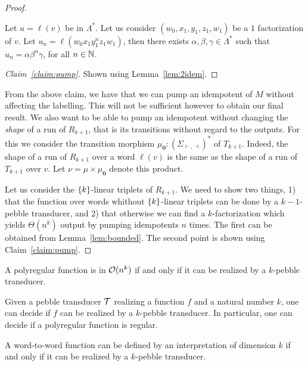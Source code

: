 \begin{proof}
    \begin{claim}\label{claim:pump}
        Let $u=\ell(v)$ be in $ \Lambda^*$.
        Let us consider $(w_0,x_1,y_1,z_1,w_1)$ be a $1$ factorization of $v$.
        Let $u_n=\ell(w_0x_1y_1^nz_1w_1)$, then there exists $\alpha,\beta,\gamma\in \Lambda^*$ such that $u_n=\alpha\beta^n\gamma$, for all $n\in \mathbb{N}$.
    \end{claim}
\begin{proof}[Claim~\ref{claim:pump}]
    Shown using Lemma~\ref{lem:2idem}.
\end{proof}
From the above claim, we have that we can pump an idempotent of $M$ without affecting the labelling.
This will not be sufficient however to obtain our final result. We also want to be able to pump an idempotent without changing the \emph{shape} of a run of $R_{k+1}$, that is its transitions without regard to the outputs.
For this we consider the transition morphism $\mu_{\mathbf 0}:(\Sigma_{\vdash,\dashv})^*$ of $T_{k+1}$. Indeed, the shape of a run of $R_{k+1}$ over a word $\ell(v)$ is the same as the shape of a run of $T_{k+1}$ over $v$.
Let $\nu=\mu\times \mu_{\mathbf 0}$ denote this product.

Let us consider the $\{k\}$-linear triplets of $R_{k+1}$.
We need to show two things, 1) that the function over words whithout $\{k\}$-linear triplets can be done by a $k{-}1$-pebble transducer, and 2) that otherwise we can find a $k$-factorization which yields $\Theta(n^k)$ output by pumping idempotents $n$ times.
The first can be obtained from Lemma~\ref{lem:bounded}. The second point is shown using Claim~\ref{claim:pump}.
\end{proof}

\begin{theorem}
    A polyregular function is in ${\mathcal O}(n^k)$ if and only if it can be realized by a $k$-pebble transducer.
\end{theorem}

\begin{theorem}
    Given a pebble transducer ${\mathcal T}$ realizing a function $f$ and a natural number $k$, one can decide if $f$ can be realized by a $k$-pebble transducer. In particular, one can decide if a polyregular function is regular.
\end{theorem}



\begin{corollary}
    A word-to-word function can be defined by an \mso interpretation of dimension $k$ if and only if it can be realized by a $k$-pebble transducer.
\end{corollary}